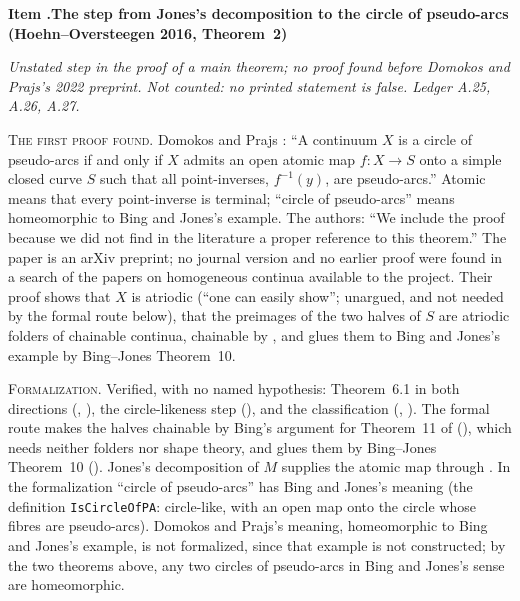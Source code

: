 \documentclass[11pt]{article}
\newcounter{defect}
\newenvironment{defect}[4]{%
  \par\addvspace{10pt}\refstepcounter{defect}%
  \noindent\textbf{Item \thedefect.\enspace #1}\par\nopagebreak
  \noindent\textit{#2}\par\nopagebreak\smallskip}{\par\addvspace{6pt}}
\newcommand{\fld}[1]{\par\noindent\textsc{#1.}\enspace}
\begin{document}
\begin{defect}{The step from Jones's decomposition to the circle of pseudo-arcs (Hoehn--Oversteegen
2016, Theorem~2)}{Unstated step in the proof of a main theorem; no proof found before
Domokos and Prajs's 2022 preprint. Not counted: no printed statement is false. Ledger A.25, A.26,
A.27.}{0}{0}
\fld{The first proof found} Domokos and Prajs \cite[Theorem~6.1]{DP22}: ``A continuum $X$ is a
circle of pseudo-arcs if and only if $X$ admits an open atomic map $f\colon X\to S$ onto a simple
closed curve $S$ such that all point-inverses, $f^{-1}(y)$, are pseudo-arcs.'' Atomic means that
every point-inverse is terminal; ``circle of pseudo-arcs'' means homeomorphic to Bing and Jones's
example. The authors: ``We include the proof because we did not find in the literature a proper
reference to this theorem.'' The paper is an arXiv preprint; no journal version and no earlier
proof were found in a search of the papers on homogeneous continua available to the project. Their
proof shows that $X$ is atriodic (``one can easily show''; unargued, and not needed by the formal
route below), that the preimages of the two halves of $S$ are atriodic folders of chainable
continua, chainable by \cite[Proposition~6]{HMP20}, and glues them to Bing and Jones's example by
Bing--Jones Theorem~10.

\fld{Formalization} Verified, with no named hypothesis: Theorem~6.1 in both directions
(, ), the circle-likeness step
(), and the classification (,
). The formal route makes the halves chainable by Bing's argument
for Theorem~11 of \cite{B51a} (), which needs neither folders nor
shape theory, and glues them by Bing--Jones Theorem~10 (). Jones's decomposition of
$M$ supplies the atomic map through . In the formalization ``circle of
pseudo-arcs'' has Bing and Jones's meaning (the definition \texttt{IsCircleOfPA}: circle-like,
with an open map onto the circle whose fibres are pseudo-arcs). Domokos and Prajs's meaning,
homeomorphic to Bing and Jones's example, is not formalized, since that example is not constructed;
by the two theorems above, any two circles of pseudo-arcs in Bing and Jones's sense are
homeomorphic.
\end{defect}
\end{document}
